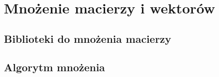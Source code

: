 \documentclass[11pt,a4paper]{report}
\begin{document}
\section{Mnożenie macierzy i wektorów}
\subsection{Biblioteki do mnożenia macierzy}
\subsection{Algorytm mnożenia}
\end{document}
